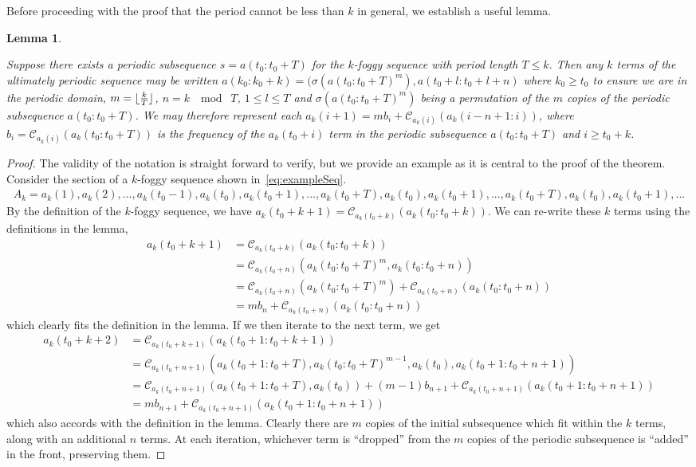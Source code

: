 \documentclass{article}
\DeclarePairedDelimiter\floor{\lfloor}{\rfloor}
\newtheorem{lemma}{Lemma}
\begin{document}
Before proceeding with the proof that the period cannot be less than $k$ in general, we establish a useful lemma.
\begin{lemma}\label{lemma:notation}

Suppose there exists a periodic subsequence $s = a(t_0:t_0+T)$ for the $k$-foggy sequence with period length $T\leq k$. Then any $k$ terms of the ultimately periodic sequence may be written $a(k_0:k_0+k) = (\sigma(a(t_0:t_0+T)^m),a(t_0+l:t_0+l+n)$ where $k_0 \geq t_0$ to ensure we are in the periodic domain, $m = \floor{\frac{k}{T}}$, $n = k \; \mod\; T$, $1 \leq l \leq T$ and $\sigma(a(t_0:t_0+T)^m)$ being a permutation of the $m$ copies of the periodic subsequence $a(t_0:t_0+T)$. We may therefore represent each $a_k(i+1) = mb_{i} + \mathcal{C}_{a_k(i)}(a_k(i-n+1:i))$, where $b_i = \mathcal{C}_{a_k(i)}(a_k(t_0:t_0+T))$ is the frequency of the $a_k(t_0+i)$ term in the periodic subsequence $a(t_0:t_0+T)$ and $i\geq t_0 + k$.  
\end{lemma}

\begin{proof}
The validity of the notation is straight forward to verify, but we provide an example as it is central to the proof of the theorem. Consider the section of a $k$-foggy sequence shown in~\eqref{eq:exampleSeq}. 
\begin{align}
A_k = a_k(1),a_k(2),...,a_k(t_0-1),a_k(t_0),a_k(t_0+1),...,a_k(t_0+T),a_k(t_0),a_k(t_0+1),...,a_k(t_0+T),a_k(t_0),a_k(t_0+1),...\label{eq:exampleSeq}
\end{align}
By the definition of the $k$-foggy sequence, we have $a_k(t_0+k+1) = \mathcal{C}_{a_k(t_0+k)}(a_k(t_0:t_0+k))$. We can re-write these $k$ terms using the definitions in the lemma, 
\begin{align*}
a_k(t_0+k+1) &= \mathcal{C}_{a_k(t_0+k)}(a_k(t_0:t_0+k))\\
&= \mathcal{C}_{a_k(t_0+n)}( a_k(t_0:t_0+T)^m,a_k(t_0:t_0+n)) \\ 
&= \mathcal{C}_{a_k(t_0+n)}( a_k(t_0:t_0+T)^m)+ \mathcal{C}_{a_k(t_0+n)}(a_k(t_0:t_0+n)) \\ 
&= m b_n+ \mathcal{C}_{a_k(t_0+n)}(a_k(t_0:t_0+n))
\end{align*}
which clearly fits the definition in the lemma. If we then iterate to the next term, we get
\begin{align*}
a_k(t_0+k+2) &= \mathcal{C}_{a_k(t_0+k+1)}(a_k(t_0+1:t_0+k+1))\\
&= \mathcal{C}_{a_k(t_0+n+1)}( a_k(t_0+1:t_0+T),a_k(t_0:t_0+T)^{m-1},a_k(t_0),a_k(t_0+1:t_0+n+1))\\
&= \mathcal{C}_{a_k(t_0+n+1)}(a_k(t_0+1:t_0+T),a_k(t_0))+ (m-1)b_{n+1} + \mathcal{C}_{a_k(t_0+n+1)}(a_k(t_0+1:t_0+n+1))\\
&= m b_{n+1} + \mathcal{C}_{a_k(t_0+n+1)}(a_k(t_0+1:t_0+n+1))
\end{align*}
which also accords with the definition in the lemma. Clearly there are $m$ copies of the initial subsequence which fit within the $k$ terms, along with an additional $n$ terms. At each iteration, whichever term is ``dropped'' from the $m$ copies of the periodic subsequence is ``added'' in the front, preserving them.
\end{proof}
\end{document}
